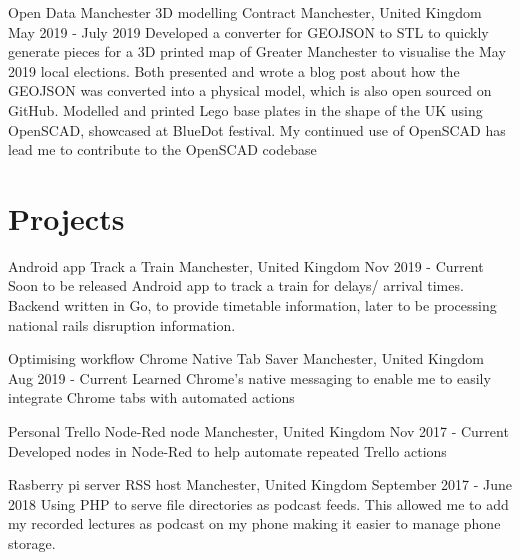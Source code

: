 \documentclass{my_cv}
\begin{document}
\workDetails
{Open Data Manchester}
{3D modelling}
{Contract}
{Manchester, United Kingdom}
{May 2019 - July 2019}
\workdetails
{Developed a converter for GEOJSON to STL to quickly generate pieces for a 3D printed map of Greater Manchester to visualise the May 2019 local elections. Both presented and wrote a blog post about how the GEOJSON was converted into a physical model, which is also open sourced on GitHub. }
{Modelled and printed Lego base plates in the shape of the UK using OpenSCAD, showcased at BlueDot festival. My continued use of OpenSCAD has lead me to contribute to the OpenSCAD codebase}
\stopworkdetails

\section{Projects}
\experianceDetails
{Android app}
{Track a Train}
{}
{Manchester, United Kingdom}
{Nov 2019 - Current}
\workdetails
{Soon to be released Android app to track a train for delays/ arrival times. Backend written in Go, to provide timetable information, later to be processing national rails disruption information.}
\stopworkdetails


\experianceDetails
{Optimising workflow}
{Chrome Native Tab Saver}
{}
{Manchester, United Kingdom}
{Aug 2019 - Current}
\workdetails
{Learned Chrome's native messaging to enable me to easily integrate Chrome tabs with automated actions}
\stopworkdetails

\experianceDetails
{Personal}
{Trello Node-Red node}
{}
{Manchester, United Kingdom}
{Nov 2017 - Current}
\workdetails
{Developed nodes in Node-Red to help automate repeated Trello actions}
\stopworkdetails



\experianceDetails
{Rasberry pi server}
{RSS host}
{}
{Manchester, United Kingdom}
{September 2017 - June 2018 }
\workdetails
{Using PHP to serve file directories as podcast  feeds. This allowed me to add my recorded lectures as podcast on my phone making it easier to manage phone storage.}
\stopworkdetails
\end{document}
